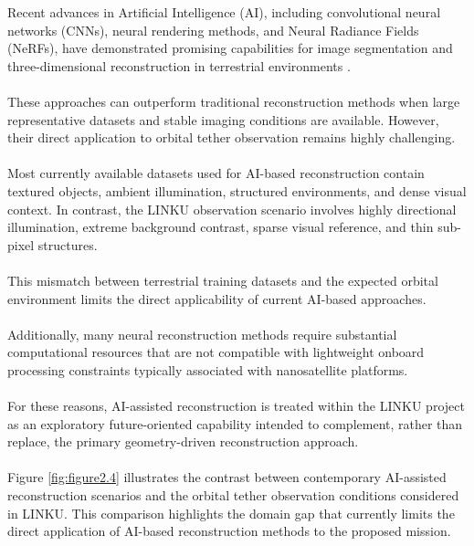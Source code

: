 Recent advances in Artificial Intelligence (AI), including convolutional neural networks (CNNs), neural rendering methods, and Neural Radiance Fields (NeRFs), have demonstrated promising capabilities for image segmentation and three-dimensional reconstruction in terrestrial environments \cite{kniaz2020wire,xie2019pix2vox,melas2023realfusion}.
\\\\
These approaches can outperform traditional reconstruction methods when large representative datasets and stable imaging conditions are available. However, their direct application to orbital tether observation remains highly challenging.
\\\\
Most currently available datasets used for AI-based reconstruction contain textured objects, ambient illumination, structured environments, and dense visual context. In contrast, the LINKU observation scenario involves highly directional illumination, extreme background contrast, sparse visual reference, and thin sub-pixel structures.
\\\\
This mismatch between terrestrial training datasets and the expected orbital environment limits the direct applicability of current AI-based approaches.
\\\\
Additionally, many neural reconstruction methods require substantial computational resources that are not compatible with lightweight onboard processing constraints typically associated with nanosatellite platforms.
\\\\
For these reasons, AI-assisted reconstruction is treated within the LINKU project as an exploratory future-oriented capability intended to complement, rather than replace, the primary geometry-driven reconstruction approach.
\\\\
Figure \ref{fig:figure2.4} illustrates the contrast between contemporary AI-assisted reconstruction scenarios and the orbital tether observation conditions considered in LINKU. This comparison highlights the domain gap that currently limits the direct application of AI-based reconstruction methods to the proposed mission.

